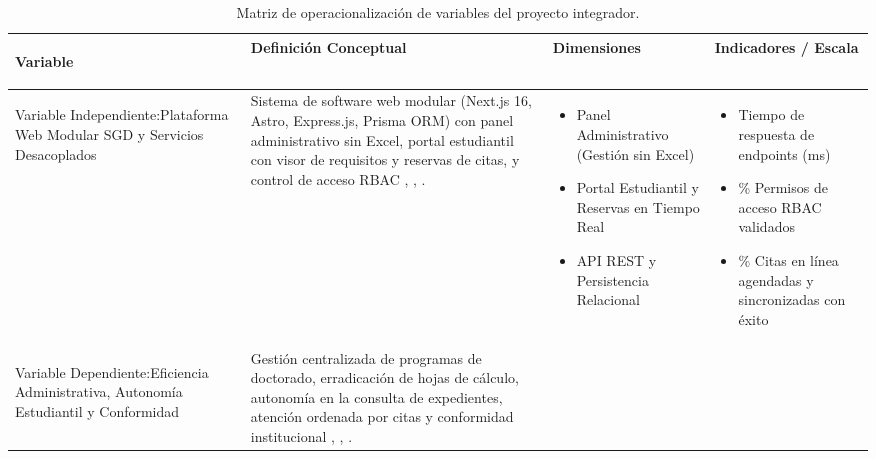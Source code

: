 \begin{table}[H]
    \centering
    \small
    \caption{Matriz de operacionalización de variables del proyecto integrador.}
    \label{tab:operacionalizacion}
    \begin{tabularx}{\linewidth}{>{\bfseries\raggedright\arraybackslash}p{3.2cm} >{\raggedright\arraybackslash}X >{\raggedright\arraybackslash}X >{\raggedright\arraybackslash}X}
        \toprule
        \rowcolor{TableHeadBg}
        \color{white}\textbf{Variable} & 
        \color{white}\textbf{Definición Conceptual} & 
        \color{white}\textbf{Dimensiones} & 
        \color{white}\textbf{Indicadores / Escala} \\
        \midrule
        Variable Independiente:\newline Plataforma Web Modular SGD y Servicios Desacoplados & 
        Sistema de software web modular (Next.js 16, Astro, Express.js, Prisma ORM) con panel administrativo sin Excel, portal estudiantil con visor de requisitos y reservas de citas, y control de acceso RBAC \cite{fowler}, \cite{vercel_nextjs}, \cite{express_docs}. & 
        \begin{itemize}[leftmargin=*,noitemsep,topsep=0pt,partopsep=0pt,parsep=0pt]
            \item Panel Administrativo (Gestión sin Excel)
            \item Portal Estudiantil y Reservas en Tiempo Real
            \item API REST y Persistencia Relacional
        \end{itemize} & 
        \begin{itemize}[leftmargin=*,noitemsep,topsep=0pt,partopsep=0pt,parsep=0pt]
            \item Tiempo de respuesta de endpoints (ms)
            \item \% Permisos de acceso RBAC validados
            \item \% Citas en línea agendadas y sincronizadas con éxito
        \end{itemize} \\
        \rowcolor{TableAltRow}
        Variable Dependiente:\newline Eficiencia Administrativa, Autonomía Estudiantil y Conformidad & 
        Gestión centralizada de programas de doctorado, erradicación de hojas de cálculo, autonomía en la consulta de expedientes, atención ordenada por citas y conformidad institucional \cite{loes}, \cite{reglamento_uce}, \cite{ieee_requirements}. & 
        \begin{itemize}[leftmargin=*,noitemsep,topsep=0pt,partopsep=0pt,parsep=0pt]

\end{itemize}
\end{tabularx}
\end{table}
